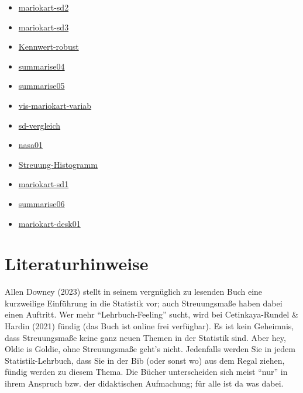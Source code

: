 \documentclass[
  letterpaper,
  oneside,
  open=any]{scrbook}
\providecommand{\tightlist}{%
  \setlength{\itemsep}{0pt}\setlength{\parskip}{0pt}}\usepackage{longtable,booktabs,array}
\theoremstyle{definition}
\theoremstyle{definition}
\theoremstyle{definition}
\theoremstyle{remark}
\begin{document}
\begin{itemize}
\tightlist
\item
  \href{https://sebastiansauer.github.io/Datenwerk/posts/mariokart-sd2/mariokart-sd2}{mariokart-sd2}
\item
  \href{https://sebastiansauer.github.io/Datenwerk/posts/mariokart-sd3/mariokart-sd3}{mariokart-sd3}
\item
  \href{https://sebastiansauer.github.io/Datenwerk/posts/kennwert-robust/kennwert-robust}{Kennwert-robust}
\item
  \href{https://sebastiansauer.github.io/Datenwerk/posts/summarise04/summarise04}{summarise04}
\item
  \href{https://sebastiansauer.github.io/Datenwerk/posts/summarise05/summarise05}{summarise05}
\item
  \href{https://sebastiansauer.github.io/Datenwerk/posts/vis-mariokart-variab/vis-mariokart-variab}{vis-mariokart-variab}
\item
  \href{https://sebastiansauer.github.io/Datenwerk/posts/sd-vergleich/sd-vergleich}{sd-vergleich}
\item
  \href{https://sebastiansauer.github.io/Datenwerk/posts/nasa01/nasa01}{nasa01}
\item
  \href{https://sebastiansauer.github.io/Datenwerk/posts/streuung-histogramm/streuung-histogramm}{Streuung-Histogramm}
\item
  \href{https://sebastiansauer.github.io/Datenwerk/posts/mariokart-sd1/mariokart-sd1}{mariokart-sd1}
\item
  \href{https://sebastiansauer.github.io/Datenwerk/posts/summarise06/summarise06}{summarise06}
\item
  \href{https://sebastiansauer.github.io/Datenwerk/posts/mariokart-desk01/mariokart-desk01}{mariokart-desk01}
\end{itemize}

\section{Literaturhinweise}\label{literaturhinweise-5}

Allen Downey (2023) stellt in seinem vergnüglich zu lesenden Buch eine
kurzweilige Einführung in die Statistik vor; auch Streuungsmaße haben
dabei einen Auftritt. Wer mehr \enquote{Lehrbuch-Feeling} sucht, wird
bei Cetinkaya-Rundel \& Hardin (2021) fündig (das Buch ist online frei
verfügbar). Es ist kein Geheimnis, dass Streuungsmaße keine ganz neuen
Themen in der Statistik sind. Aber hey, Oldie is Goldie, ohne
Streuungsmaße geht's nicht. Jedenfalls werden Sie in jedem
Statistik-Lehrbuch, dass Sie in der Bib (oder sonst wo) aus dem Regal
ziehen, fündig werden zu diesem Thema. Die Bücher unterscheiden sich
meist \enquote{nur} in ihrem Anspruch bzw. der didaktischen Aufmachung;
für alle ist da was dabei.
\end{document}
